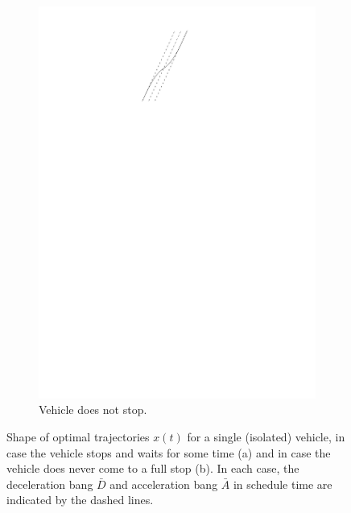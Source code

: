 \documentclass[a4paper]{article}
\theoremstyle{definition}
\theoremstyle{plain}
\begin{document}
\begin{figure}
\begin{subfigure}{0.3\textwidth}
    \includegraphics[scale=1]{figures/motion/single_trajectory_merged}
    \caption{Vehicle does not stop.}
    \label{fig:single_trajectory_merge}
\end{subfigure}
\caption{Shape of optimal trajectories $x(t)$ for a single (isolated) vehicle,
  in case the vehicle stops and waits for some time (a) and in case the vehicle
  does never come to a full stop (b). In each case, the deceleration bang
  $\bar{D}$ and acceleration bang $\bar{A}$ in schedule time are indicated by
  the dashed lines.}
  \label{fig:single_trajectory}
\end{figure}
\end{document}
